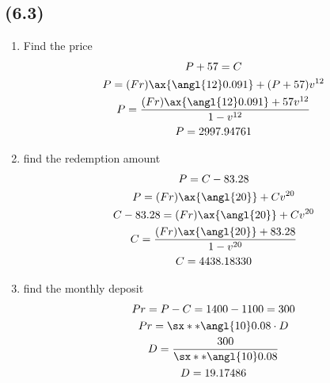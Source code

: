 \documentclass[a4paper, 12pt, reqno]{amsart}
\begin{document}
\subsection*{(6.3)}

\begin{enumerate}
    \item Find the price
        \begin{equation}\nonumber
            \begin{gathered}
                P + 57 = C  \\
                P = (Fr)\ax{\angl{12} 0.091} + (P + 57) v^{12}  \\
                P = \frac{(Fr)\ax{\angl{12} 0.091} + 57 v^{12}}{1 - v^{12}}\\
                P = 2997.94761
            \end{gathered}
        \end{equation}
    \item find the redemption amount
        \begin{equation}\nonumber
            \begin{gathered}
                P = C - 83.28   \\
                P = (Fr)\ax{\angl{20}} + C v^{20}  \\
                C - 83.28 = (Fr)\ax{\angl{20}} + C v^{20}  \\
                C = \frac{(Fr)\ax{\angl{20}} + 83.28}{1 - v^{20}}  \\
                C = 4438.18330
            \end{gathered}
        \end{equation}
    \item find the monthly deposit
        \begin{equation}\nonumber
            \begin{gathered}
                Pr = P - C = 1400 - 1100 = 300      \\
                Pr = \sx**{\angl{10} 0.08} \cdot D  \\
                D = \frac{300}{\sx**{\angl{10} 0.08}}       \\
                D = 19.17486
            \end{gathered}
        \end{equation}
\end{enumerate}
\end{document}
